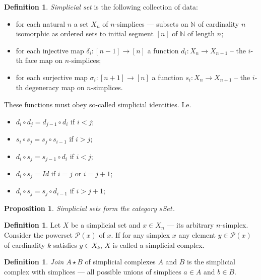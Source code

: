 \documentclass[english,12pt]{article}
\newcounter{stmcounter}[section]
\numberwithin{equation}{section}
\newtheorem{proposition}[stmcounter]{Proposition}
\theoremstyle{definition}
\newtheorem{definition}[stmcounter]{Definition}
\theoremstyle{remark}
\newcommand{\define}[1]{{\textit{#1}}}
\begin{document}
\begin{definition}
  \define{Simplicial set} is the following collection of data:
  \begin{itemize}
     \item for each natural $n$ a set $X_n$ of $n$-simplices --- subsets on $\mathbb{N}$ of cardinality $n$ isomorphic as ordered sets to initial segment $[n]$ of $\mathbb{N}$ of length $n$;
     \item for each injective map $\delta_i : [n-1] \to [n]$ a function $d_i: X_n \to X_{n-1}$ – the $i$-th face map on $n$-simplices;
     \item for each surjective map $\sigma_i : [n+1] \to [n]$ a function $s_i : X_n \to X_{n+1}$ – the $i$-th degeneracy map on $n$-simplices.
  \end{itemize}

  These functions must obey so-called simplicial identities. I.e.
  \begin{itemize}
    \item $d_i \circ d_j = d_{j-1} \circ d_i$ if $i < j$;
    \item $s_i \circ s_j = s_j \circ s_{i-1}$ if $i > j$;
    \item $d_i \circ s_j = s_{j-1} \circ d_i$ if $i < j$;
    \item $d_i \circ s_j = Id$ if $i = j$ or $i = j + 1$;
    \item $d_i \circ s_j = s_j \circ d_{i-1}$ if $i > j + 1$;
  \end{itemize}
\end{definition}

\begin{proposition}
  Simplicial sets form the category $sSet$.
\end{proposition}

\begin{definition}
  Let $X$ be a simplicial set and $x \in X_n$ --- its arbitrary $n$-simplex. Consider the powerset $\mathcal{P}(x)$ of $x$. If for any simplex $x$ any element $y \in \mathcal{P}(x)$ of cardinality $k$ satisfies $y \in X_k$, $X$ is called a simplicial complex.
\end{definition}

\begin{definition}
  \define{Join} $A \star B$ of simplicial complexes $A$ and $B$ is the simplicial complex with simplices --- all possible unions of simplices $a \in A$ and $b \in B$.
\end{definition}
\end{document}

